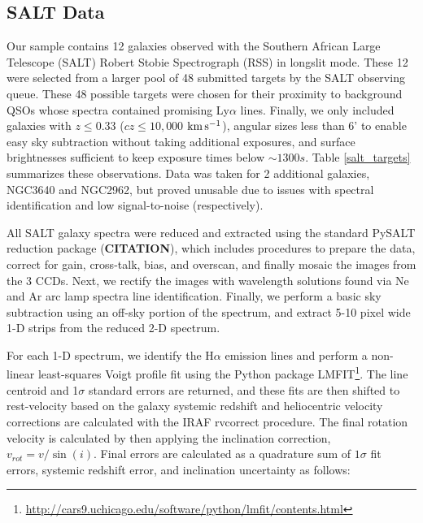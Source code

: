 \documentclass[iop]{emulateapj-rtx4}
\newcommand{\kms}{$\rm km\, s^{-1}$}
\begin{document}
\subsection{SALT Data}
Our sample contains 12 galaxies observed with the Southern African Large Telescope (SALT) Robert Stobie Spectrograph (RSS) in longslit mode. These 12 were selected from a larger pool of 48 submitted targets by the SALT observing queue. These 48 possible targets were chosen for their proximity to background QSOs whose spectra contained promising Ly$\alpha$ lines. Finally, we only included galaxies with $z \leq 0.33$ ($cz \leq 10,000$ \kms), angular sizes less than 6' to enable easy sky subtraction without taking additional exposures, and surface brightnesses sufficient to keep exposure times below $\sim 1300 s$. Table \ref{salt_targets} summarizes these observations. Data was taken for 2 additional galaxies, NGC3640 and NGC2962, but proved unusable due to issues with spectral identification and low signal-to-noise (respectively).



All SALT galaxy spectra were reduced and extracted using the standard PySALT reduction package (\textbf{CITATION}), which includes procedures to prepare the data, correct for gain, cross-talk, bias, and overscan, and finally mosaic the images from the 3 CCDs. Next, we rectify the images with wavelength solutions found via Ne and Ar arc lamp spectra line identification. Finally, we perform a basic sky subtraction using an off-sky portion of the spectrum, and extract 5-10 pixel wide 1-D strips from the reduced 2-D spectrum. 

For each 1-D spectrum, we identify the H$\alpha$ emission lines and perform a non-linear least-squares Voigt profile fit using the Python package LMFIT\footnote{\url{http://cars9.uchicago.edu/software/python/lmfit/contents.html}}. The line centroid and 1$\sigma$ standard errors are returned, and these fits are then shifted to rest-velocity based on the galaxy systemic redshift and heliocentric velocity corrections are calculated with the IRAF rvcorrect procedure. The final rotation velocity is calculated by then applying the inclination correction, $v_{rot} = v / \sin(i)$. Final errors are calculated as a quadrature sum of $1\sigma$ fit errors, systemic redshift error, and inclination uncertainty as follows:
\end{document}
